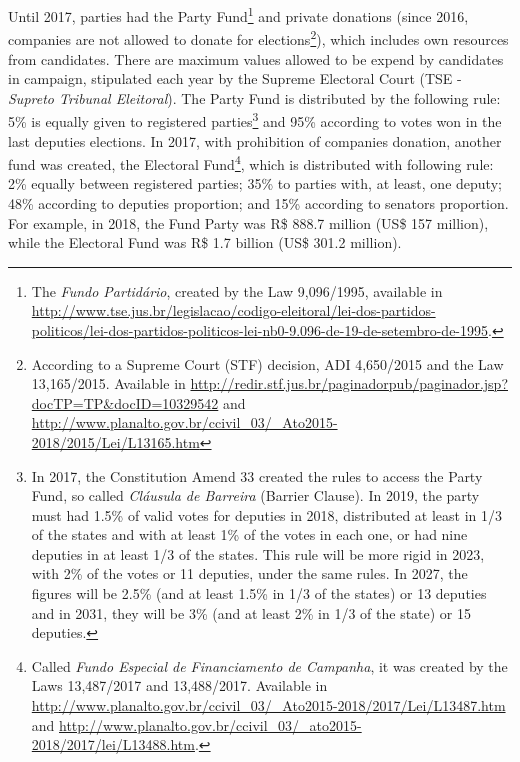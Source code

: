 \documentclass[
  12pt,
]{article}
\begin{document}
Until 2017, parties had the Party Fund\footnote{The \emph{Fundo
  Partidário}, created by the Law 9,096/1995, available in
  \url{http://www.tse.jus.br/legislacao/codigo-eleitoral/lei-dos-partidos-politicos/lei-dos-partidos-politicos-lei-nb0-9.096-de-19-de-setembro-de-1995}.}
and private donations (since 2016, companies are not allowed to donate
for elections\footnote{According to a Supreme Court (STF) decision, ADI
  4,650/2015 and the Law 13,165/2015. Available in
  \url{http://redir.stf.jus.br/paginadorpub/paginador.jsp?docTP=TP&docID=10329542}
  and
  \url{http://www.planalto.gov.br/ccivil_03/_Ato2015-2018/2015/Lei/L13165.htm}}),
which includes own resources from candidates. There are maximum values
allowed to be expend by candidates in campaign, stipulated each year by
the Supreme Electoral Court (TSE - \emph{Supreto Tribunal Eleitoral}).
The Party Fund is distributed by the following rule: 5\% is equally
given to registered parties\footnote{In 2017, the Constitution Amend 33
  created the rules to access the Party Fund, so called \emph{Cláusula
  de Barreira} (Barrier Clause). In 2019, the party must had 1.5\% of
  valid votes for deputies in 2018, distributed at least in 1/3 of the
  states and with at least 1\% of the votes in each one, or had nine
  deputies in at least 1/3 of the states. This rule will be more rigid
  in 2023, with 2\% of the votes or 11 deputies, under the same rules.
  In 2027, the figures will be 2.5\% (and at least 1.5\% in 1/3 of the
  states) or 13 deputies and in 2031, they will be 3\% (and at least 2\%
  in 1/3 of the state) or 15 deputies.} and 95\% according to votes won
in the last deputies elections. In 2017, with prohibition of companies
donation, another fund was created, the Electoral Fund\footnote{Called
  \emph{Fundo Especial de Financiamento de Campanha}, it was created by
  the Laws 13,487/2017 and 13,488/2017. Available in
  \url{http://www.planalto.gov.br/ccivil_03/_Ato2015-2018/2017/Lei/L13487.htm}
  and
  \url{http://www.planalto.gov.br/ccivil_03/_ato2015-2018/2017/lei/L13488.htm}.},
which is distributed with following rule: 2\% equally between registered
parties; 35\% to parties with, at least, one deputy; 48\% according to
deputies proportion; and 15\% according to senators proportion. For
example, in 2018, the Fund Party was R\$ 888.7 million (US\$ 157
million), while the Electoral Fund was R\$ 1.7 billion (US\$ 301.2
million).
\end{document}
